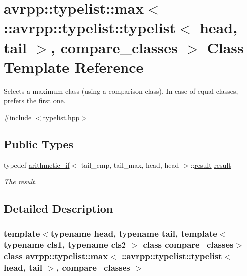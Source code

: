 \hypertarget{classavrpp_1_1typelist_1_1max_3_01_1_1avrpp_1_1typelist_1_1typelist_3_01head_00_01tail_01_4_00_01compare__classes_01_4}{
\section{avrpp::typelist::max$<$ ::avrpp::typelist::typelist$<$ head, tail $>$, compare\_\-classes $>$ Class Template Reference}
\label{classavrpp_1_1typelist_1_1max_3_01_1_1avrpp_1_1typelist_1_1typelist_3_01head_00_01tail_01_4_00_01compare__classes_01_4}
}


Selects a maximum class (using a comparison class). In case of equal classes, prefers the first one.  




{\ttfamily \#include $<$typelist.hpp$>$}

\subsection*{Public Types}
\begin{DoxyCompactItemize}
\item 
typedef \hyperlink{classavrpp_1_1typelist_1_1arithmetic__if}{arithmetic\_\-if}$<$ tail\_\-cmp, tail\_\-max, head, head $>$::\hyperlink{classavrpp_1_1typelist_1_1max_3_01_1_1avrpp_1_1typelist_1_1typelist_3_01head_00_01tail_01_4_00_01compare__classes_01_4_a6e51ebe5ed6f1057cfd03426d7efde21}{result} \hyperlink{classavrpp_1_1typelist_1_1max_3_01_1_1avrpp_1_1typelist_1_1typelist_3_01head_00_01tail_01_4_00_01compare__classes_01_4_a6e51ebe5ed6f1057cfd03426d7efde21}{result}
\begin{DoxyCompactList}\small\item\em The result. \item\end{DoxyCompactList}\end{DoxyCompactItemize}


\subsection{Detailed Description}
\subsubsection*{template$<$typename head, typename tail, template$<$ typename cls1, typename cls2 $>$ class compare\_\-classes$>$ class avrpp::typelist::max$<$ ::avrpp::typelist::typelist$<$ head, tail $>$, compare\_\-classes $>$}

